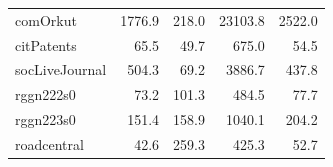 \begin{table}[tbp]
\begin{center}
{\begin{tabular}{|l|r|r|r|r|}
        \rowcolor{black!10} comOrkut&1776.9&218.0&23103.8&2522.0\\
        \rowcolor{black!2 } citPatents&65.5&49.7&675.0&54.5\\
        \rowcolor{black!10} socLiveJournal&504.3&69.2&3886.7&437.8\\
        \rowcolor{black!2 } rggn222s0&73.2&101.3&484.5&77.7\\
        \rowcolor{black!10} rggn223s0&151.4&158.9&1040.1&204.2\\
        \rowcolor{black!2 } roadcentral&42.6&259.3&425.3&52.7\\
        \hline
        \end{tabular}
        }
        \label{rq1_table}
    \end{center}
    \end{table}
    
